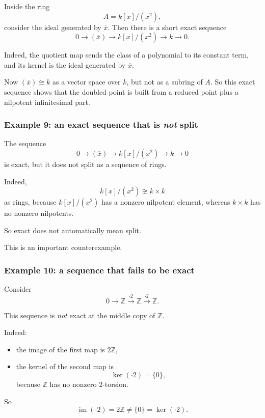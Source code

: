 \documentclass[12pt,a4paper]{article}
\theoremstyle{notespace}
\theoremstyle{definition}
\begin{document}
Inside the ring
\[
A=k[x]/(x^2),
\]
consider the ideal generated by \(\overline{x}\). Then there is a short exact sequence
\[
0 \longrightarrow (\overline{x}) \longrightarrow k[x]/(x^2) \longrightarrow k \longrightarrow 0.
\]

Indeed, the quotient map sends the class of a polynomial to its constant term, and its kernel is the ideal generated by \(\overline{x}\).

Now \((\overline{x})\cong k\) as a vector space over \(k\), but not as a subring of \(A\).  
So this exact sequence shows that the doubled point is built from a reduced point plus a nilpotent infinitesimal part.

\subsubsection{Example 9: an exact sequence that is \emph{not} split}

The sequence
\[
0 \longrightarrow (\overline{x}) \longrightarrow k[x]/(x^2) \longrightarrow k \longrightarrow 0
\]
is exact, but it does not split as a sequence of rings.

Indeed,
\[
k[x]/(x^2)\not\cong k\times k
\]
as rings, because \(k[x]/(x^2)\) has a nonzero nilpotent element, whereas \(k\times k\) has no nonzero nilpotents.

So exact does not automatically mean split.

This is an important counterexample.

\subsubsection{Example 10: a sequence that fails to be exact}

Consider
\[
0 \longrightarrow \mathbb Z \xrightarrow{\cdot 2} \mathbb Z \xrightarrow{\cdot 2} \mathbb Z.
\]

This sequence is \emph{not} exact at the middle copy of \(\mathbb Z\).

Indeed:

\begin{itemize}
	\item the image of the first map is \(2\mathbb Z\),
	\item the kernel of the second map is
	\[
	\ker(\cdot 2)=\{0\},
	\]
	because \(\mathbb Z\) has no nonzero \(2\)-torsion.
\end{itemize}

So
\[
\operatorname{im}(\cdot 2)=2\mathbb Z \neq \{0\}=\ker(\cdot 2).
\]
\end{document}
